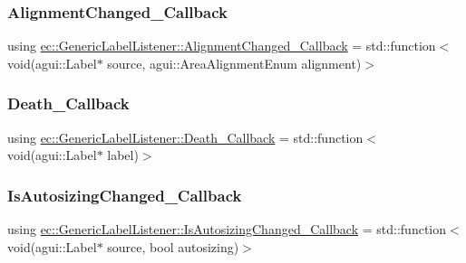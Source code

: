 \subsubsection{\texorpdfstring{Alignment\+Changed\+\_\+\+Callback}{AlignmentChanged\_Callback}}
{\footnotesize\ttfamily using \mbox{\hyperlink{classec_1_1_generic_label_listener_af470c076b7748036de36bc1d99bce445}{ec\+::\+Generic\+Label\+Listener\+::\+Alignment\+Changed\+\_\+\+Callback}} =  std\+::function$<$void(agui\+::\+Label$\ast$ source, agui\+::\+Area\+Alignment\+Enum alignment)$>$}

\mbox{\label{classec_1_1_generic_label_listener_af79a68f4cb5c696fa1d921e7441d93eb}} 
\subsubsection{\texorpdfstring{Death\+\_\+\+Callback}{Death\_Callback}}
{\footnotesize\ttfamily using \mbox{\hyperlink{classec_1_1_generic_label_listener_af79a68f4cb5c696fa1d921e7441d93eb}{ec\+::\+Generic\+Label\+Listener\+::\+Death\+\_\+\+Callback}} =  std\+::function$<$void(agui\+::\+Label$\ast$ label)$>$}

\mbox{\label{classec_1_1_generic_label_listener_adf4cec1bd13682ce66c52f0484fe46c6}} 
\subsubsection{\texorpdfstring{Is\+Autosizing\+Changed\+\_\+\+Callback}{IsAutosizingChanged\_Callback}}
{\footnotesize\ttfamily using \mbox{\hyperlink{classec_1_1_generic_label_listener_adf4cec1bd13682ce66c52f0484fe46c6}{ec\+::\+Generic\+Label\+Listener\+::\+Is\+Autosizing\+Changed\+\_\+\+Callback}} =  std\+::function$<$void(agui\+::\+Label$\ast$ source, bool autosizing)$>$}



